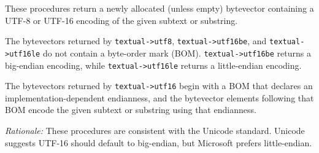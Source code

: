 \begin{entry}{%
  }
  
These procedures return a newly allocated (unless empty) bytevector
containing a UTF-8 or UTF-16 encoding of the given subtext or substring.

The bytevectors returned by \texttt{textual->utf8},
\texttt{textual->utf16be}, and
\texttt{textual->utf16le} do not contain a byte-order mark
(BOM). \texttt{textual->utf16be} returns a big-endian
encoding, while \texttt{textual->utf16le} returns a
little-endian encoding.

The bytevectors returned by \texttt{textual->utf16} begin
with a BOM that declares an implementation-dependent endianness, and the
bytevector elements following that BOM encode the given subtext or
substring using that endianness.

\emph{Rationale:} These procedures are consistent with the Unicode
standard. Unicode suggests UTF-16 should default to big-endian, but
Microsoft prefers little-endian.
\end{entry}

